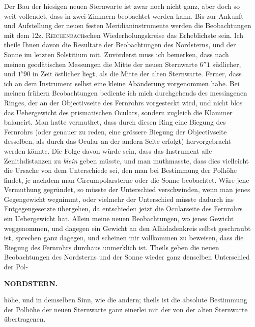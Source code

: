 \par\indent Der Bau der hiesigen neuen Sternwarte ist zwar noch nicht ganz, aber doch so weit vollendet, dass in zwei Zimmern beobachtet werden kann. Bis zur Ankunft und Aufstellung der neuen festen Meridianinstrumente werden die Beobachtungen mit dem 12z. \textsc{Reichenbach}schen Wiederholungskreise das Erheblichste sein. Ich theile Ihnen davon die Resultate der Beobachtungen des Nordsterns, und der Sonne im letzten Solstitium mit. Zuvörderst muss ich bemerken, dass nach meinen geodätischen Messungen die Mitte der neuen Sternwarte $6''1$ südlicher, und $1^{\mathrm s}90$ in Zeit östlicher liegt, als die Mitte der alten Sternwarte. Ferner, dass ich an dem Instrument selbst eine kleine Abänderung vorgenommen habe. Bei meinen frühern Beobachtungen bediente ich mich durchgehends des messingenen Ringes, der an der Objectivseite des Fernrohrs vorgesteckt wird, und nicht blos das Uebergewicht des prismatischen Oculars, sondern zugleich die Klammer balancirt. Man hatte vermuthet, dass durch diesen Ring eine Biegung des Fernrohrs (oder genauer zu reden, eine grössere Biegung der Objectivseite desselben, als durch das Ocular an der andern Seite erfolgt) hervorgebracht werden könnte. Die Folge davon würde sein, dass das Instrument alle Zenithdistanzen zu \emph{klein} geben müsste, und man muthmasste, dass dies vielleicht die Ursache von dem Unterschiede sei, den man bei Bestimmung der Polhöhe findet, je nachdem man Circumpolarsterne oder die Sonne beobachtet. Wäre jene Vermuthung gegründet, so müsste der Unterschied verschwinden, wenn man jenes Gegengewicht wegnimmt, oder vielmehr der Unterschied müsste dadurch ins Entgegengesetzte übergehen, da entschieden jetzt die Ocularseite des Fernrohrs ein Uebergewicht hat. Allein meine neuen Beobachtungen, wo jenes Gewicht weggenommen, und dagegen ein Gewicht an den Alhidadenkreis selbst geschraubt ist, sprechen ganz dagegen, und scheinen mir vollkommen zu beweisen, dass die Biegung des Fernrohrs durchaus unmerklich ist. Theils geben die neuen Beobachtungen des Nordsterns und der Sonne wieder ganz denselben Unterschied der Pol-\par
\clearpage
\thispagestyle{empty}
\noindent{}%
\makebox[12mm][l]{}%
\parbox[t]{\dimexpr\linewidth-24mm\relax}{\centering\footnotesize\bfseries NORDSTERN.\par}%
\par\nobreak\medskip
\noindent höhe, und in demselben Sinn, wie die andern; theils ist die absolute Bestimmung der Polhöhe der
neuen Sternwarte ganz einerlei mit der von der alten Sternwarte übertragenen.

